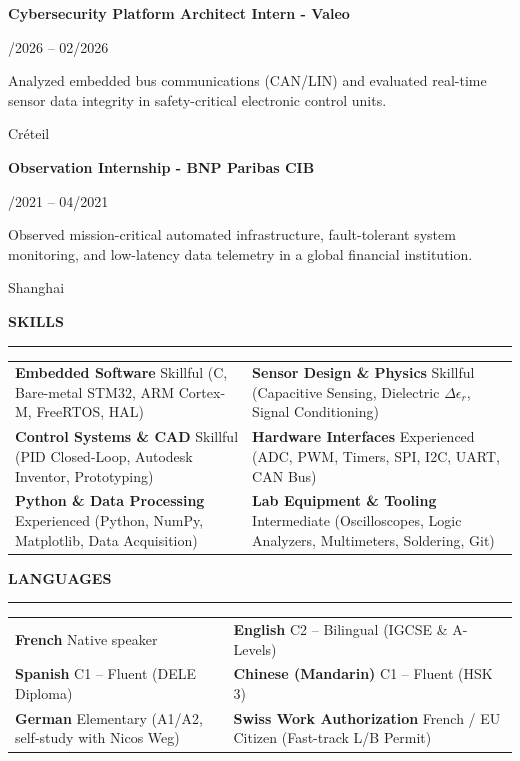 \documentclass[10pt,a4paper]{article}
\newcommand{\cvSection}[1]{%
  \vspace{6.5pt}%
  {\fontsize{10.5}{12}\selectfont \textbf{#1}}\par\vspace{1.5pt}%
  \rule{\textwidth}{0.75pt}\par\vspace{4.5pt}%
}
\newcommand{\cvItem}[4]{%
  \noindent
  \parbox[t]{0.75\textwidth}{\raggedright \textbf{#1}}\hfill
  \parbox[t]{0.24\textwidth}{\raggedleft \fontsize{8.5}{10.5}\selectfont #2}\par
  \vspace{1.5pt}
  \noindent
  \parbox[t]{0.75\textwidth}{\fontsize{8.7}{11.2}\selectfont #4}\hfill
  \parbox[t]{0.24\textwidth}{\raggedleft \fontsize{8.5}{10.5}\selectfont #3}\par
  \vspace{5pt}
}
\begin{document}
\cvItem{Cybersecurity Platform Architect Intern - Valeo}{01/2026 -- 02/2026}{Créteil}{Analyzed embedded bus communications (CAN/LIN) and evaluated real-time sensor data integrity in safety-critical electronic control units.}

\cvItem{Observation Internship - BNP Paribas CIB}{04/2021 -- 04/2021}{Shanghai}{Observed mission-critical automated infrastructure, fault-tolerant system monitoring, and low-latency data telemetry in a global financial institution.}

\cvSection{SKILLS}
\begin{tabularx}{\textwidth}{@{}X X@{}}
  \textbf{Embedded Software} \newline
  {\fontsize{8.5}{10.5}\selectfont Skillful (C, Bare-metal STM32, ARM Cortex-M, FreeRTOS, HAL)} &
  \textbf{Sensor Design \& Physics} \newline
  {\fontsize{8.5}{10.5}\selectfont Skillful (Capacitive Sensing, Dielectric $\Delta\epsilon_r$, Signal Conditioning)} \\[4.5pt]
  
  \textbf{Control Systems \& CAD} \newline
  {\fontsize{8.5}{10.5}\selectfont Skillful (PID Closed-Loop, Autodesk Inventor, Prototyping)} &
  \textbf{Hardware Interfaces} \newline
  {\fontsize{8.5}{10.5}\selectfont Experienced (ADC, PWM, Timers, SPI, I2C, UART, CAN Bus)} \\[4.5pt]
  
  \textbf{Python \& Data Processing} \newline
  {\fontsize{8.5}{10.5}\selectfont Experienced (Python, NumPy, Matplotlib, Data Acquisition)} &
  \textbf{Lab Equipment \& Tooling} \newline
  {\fontsize{8.5}{10.5}\selectfont Intermediate (Oscilloscopes, Logic Analyzers, Multimeters, Soldering, Git)}
\end{tabularx}

\cvSection{LANGUAGES}
\begin{tabularx}{\textwidth}{@{}X X@{}}
  \textbf{French} \newline
  {\fontsize{8.5}{10.5}\selectfont Native speaker} &
  \textbf{English} \newline
  {\fontsize{8.5}{10.5}\selectfont C2 -- Bilingual (IGCSE \& A-Levels)} \\[4.5pt]
  
  \textbf{Spanish} \newline
  {\fontsize{8.5}{10.5}\selectfont C1 -- Fluent (DELE Diploma)} &
  \textbf{Chinese (Mandarin)} \newline
  {\fontsize{8.5}{10.5}\selectfont C1 -- Fluent (HSK 3)} \\[4.5pt]
  
  \textbf{German} \newline
  {\fontsize{8.5}{10.5}\selectfont Elementary (A1/A2, self-study with Nicos Weg)} &
  \textbf{Swiss Work Authorization} \newline
  {\fontsize{8.5}{10.5}\selectfont French / EU Citizen (Fast-track L/B Permit)}
\end{tabularx}
\end{document}
